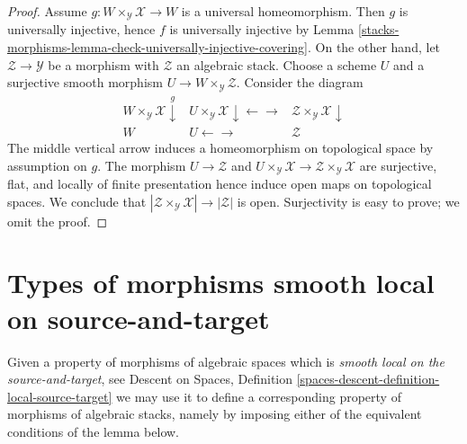 \begin{proof}
Assume $g : W \times_\mathcal{Y} \mathcal{X} \to W$ is a universal
homeomorphism. Then $g$ is universally injective, hence $f$ is
universally injective by
Lemma \ref{stacks-morphisms-lemma-check-universally-injective-covering}.
On the other hand, let $\mathcal{Z} \to \mathcal{Y}$
be a morphism with $\mathcal{Z}$ an algebraic stack.
Choose a scheme $U$ and a surjective
smooth morphism $U \to W \times_\mathcal{Y} \mathcal{Z}$.
Consider the diagram
$$
\begin{array}{ccc}W \times_\mathcal{Y} \mathcal{X} \overset{g}{\downarrow} & U \times_\mathcal{Y} \mathcal{X} \downarrow\longleftarrow\longrightarrow & \mathcal{Z} \times_\mathcal{Y} \mathcal{X} \downarrow \\ W & U \longleftarrow\longrightarrow & \mathcal{Z}\end{array}
$$
The middle vertical arrow induces a homeomorphism
on topological space by assumption on $g$.
The morphism $U \to \mathcal{Z}$ and
$U \times_\mathcal{Y} \mathcal{X} \to
\mathcal{Z} \times_\mathcal{Y} \mathcal{X}$
are surjective, flat, and locally of finite presentation
hence induce open maps on topological spaces.
We conclude that
$|\mathcal{Z} \times_\mathcal{Y} \mathcal{X}| \to |\mathcal{Z}|$
is open. Surjectivity is easy to prove; we omit the proof.
\end{proof}

\section{Types of morphisms smooth local on source-and-target}
\label{stacks-morphisms-section-local-source-target}
Given a property of morphisms of algebraic spaces which is
{\it smooth local on the source-and-target}, see
Descent on Spaces,
Definition \ref{spaces-descent-definition-local-source-target}
we may use it to define a corresponding
property of morphisms of algebraic stacks, namely by imposing either of
the equivalent conditions of the lemma below.

